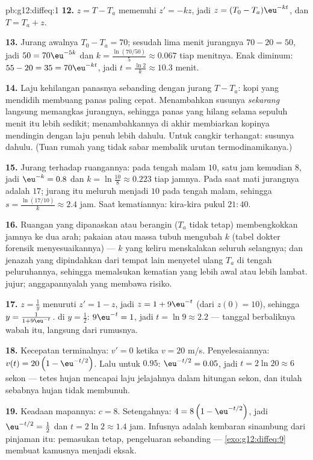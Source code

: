 \begin{solution}{pb:g12:diffeq:1}
\textbf{12.} $z = T - T_a$ memenuhi $z' = -kz$, jadi
$z = (T_0 - T_a)\eu^{-kt}$, dan $T = T_a + z$.

\textbf{13.} Jurang awalnya $T_0 - T_a = 70$; sesudah lima
menit jurangnya $70 - 20 = 50$, jadi $50 = 70\eu^{-5k}$ dan
$k = \frac{\ln(70/50)}{5} \approx 0.067$ tiap menitnya. Enak diminum:
$55 - 20 = 35 = 70\eu^{-kt}$, jadi
$t = \frac{\ln 2}{k} \approx 10.3$ menit.

\textbf{14.} Laju kehilangan panasnya sebanding dengan jurang
$T - T_a$: kopi yang mendidih membuang panas paling cepat. Menambahkan
susunya \emph{sekarang} langsung memangkas jurangnya, sehingga panas yang
hilang selama sepuluh menit itu lebih sedikit; menambahkannya di akhir membiarkan
kopinya mendingin dengan laju penuh lebih dahulu. Untuk cangkir terhangat: susunya
dahulu. (Tuan rumah yang tidak sabar membalik urutan termodinamikanya.)

\textbf{15.} Jurang terhadap ruangannya: pada tengah malam $10$, satu jam
kemudian $8$, jadi $\eu^{-k} = 0.8$ dan
$k = \ln\frac{10}{8} \approx 0.223$ tiap jamnya. Pada saat mati jurangnya
adalah $17$; jurang itu meluruh menjadi $10$ pada tengah malam, sehingga
$s = \frac{\ln(17/10)}{k} \approx 2.4$ jam. Saat kematiannya:
kira-kira pukul $21{:}40$.

\textbf{16.} Ruangan yang dipanaskan atau berangin ($T_a$ tidak tetap)
membengkokkan jamnya ke dua arah; pakaian atau massa tubuh mengubah $k$
(tabel dokter forensik menyesuaikannya) --- $k$ yang keliru menskalakan
seluruh selangnya; dan jenazah yang dipindahkan dari tempat lain menyetel ulang
$T_a$ di tengah peluruhannya, sehingga memalsukan kematian yang lebih awal atau
lebih lambat.  jujur; anggapannyalah yang membawa risiko.

\textbf{17.} $z = \frac1y$ menuruti $z' = 1 - z$, jadi
$z = 1 + 9\eu^{-t}$ (dari $z(0) = 10$), sehingga
$y = \frac{1}{1 + 9\eu^{-t}}$.  di $y = \frac12$:
$9\eu^{-t} = 1$, jadi $t = \ln 9 \approx 2.2$ --- tanggal berbaliknya
wabah itu, langsung dari rumusnya.

\textbf{18.} Kecepatan terminalnya: $v' = 0$ ketika $v = 20$ m/s.
Penyelesaiannya: $v(t) = 20\left(1 - \eu^{-t/2}\right)$. Lalu untuk
$0.95$: $\eu^{-t/2} = 0.05$, jadi $t = 2\ln 20 \approx 6$ sekon ---
tetes hujan mencapai laju jelajahnya dalam hitungan sekon, dan itulah
sebabnya hujan tidak membunuh.

\textbf{19.} Keadaan mapannya: $c = 8$. Setengahnya:
$4 = 8\left(1 - \eu^{-t/2}\right)$, jadi $\eu^{-t/2} = \frac12$ dan
$t = 2\ln 2 \approx 1.4$ jam. Infusnya adalah kembaran sinambung
dari pinjaman itu: pemasukan tetap, pengeluaran sebanding ---
\cref{exo:g12:diffeq:9} membuat kamusnya menjadi eksak.


\end{solution}
